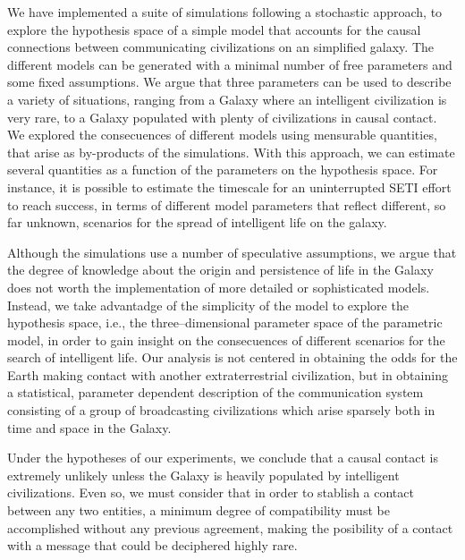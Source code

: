 \documentclass[crop]{CSLB}%
\begin{document}
We have implemented a suite of simulations following a stochastic
approach, to explore the hypothesis
space of a simple model that accounts for
the causal connections between communicating
civilizations on an simplified galaxy.
%
The different models can be generated with a minimal number of free
parameters and some fixed assumptions.
%
We argue that three parameters can be used to describe a variety of
situations, ranging from a Galaxy where an intelligent civilization is
very rare, to a Galaxy populated with plenty of civilizations in
causal contact.
%
We explored the consecuences of different models using mensurable
quantities, that arise as by-products of the simulations.
%
With this approach, we can estimate several quantities as a function
of the parameters on the hypothesis space.
%
For instance, it is possible to estimate the timescale for an
uninterrupted SETI effort to reach success, in terms of different
model parameters that reflect different, so far unknown, scenarios
for the spread of intelligent life on the galaxy.


Although the simulations use a number of speculative assumptions, we
argue that the degree of knowledge about the origin and persistence of
life in the Galaxy does not worth the implementation of more detailed
or sophisticated models.
%
Instead, we take advantadge of the simplicity of the model to explore
the hypothesis space, i.e., the three--dimensional parameter space of
the parametric model, in order to gain insight on the consecuences of
different scenarios for the search of intelligent life.
%
Our analysis is not centered in obtaining the odds for the Earth
making contact with another extraterrestrial civilization, but in 
obtaining a statistical, parameter dependent description of the
communication system consisting of a group of broadcasting
civilizations which arise sparsely both in time and space in the
Galaxy.



Under the hypotheses of our experiments, we conclude that
a causal contact is extremely unlikely unless the Galaxy is heavily
populated by intelligent civilizations.
%
Even so, we must consider that in order to stablish a contact between
any two entities, a minimum degree of compatibility must be
accomplished without any previous agreement, 
making the posibility of a contact with a message that
could be deciphered highly rare.
\end{document}
